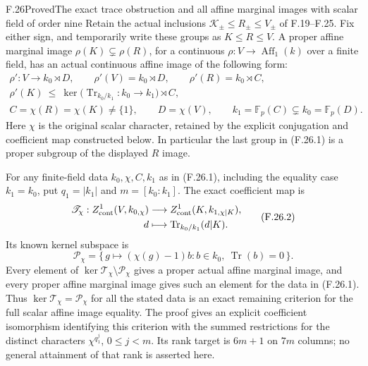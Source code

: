 \begin{claim}{F.26}{Proved}{The exact trace obstruction and all affine marginal images with scalar field of order nine}
Retain the actual inclusions
$\mathcal K_\pm\leq R_\pm\leq V_\pm$ of F.19--F.25.
Fix either sign, and temporarily write these groups as
$K\leq R\leq V$. A proper affine marginal image
$\rho(K)\subsetneq\rho(R)$, for a continuous
$\rho:V\to\operatorname{Aff}_1(k)$ over a finite field,
has an actual continuous affine image of the following form:
\[
 \begin{gathered}
 \rho':V\longrightarrow k_0\rtimes D,\qquad
 \rho'(V)=k_0\rtimes D,\qquad \rho'(R)=k_0\rtimes C,\\
 \rho'(K)\ \leq\
       \ker\bigl(\operatorname{Tr}_{k_0/k_1}:k_0\to k_1\bigr)
                       \rtimes C,\\
 C=\chi(R)=\chi(K)\ne\{1\},\qquad
 D=\chi(V),\qquad
 k_1=\mathbb F_p(C)\subsetneq k_0=\mathbb F_p(D).
 \end{gathered}                                                \tag{F.26.1}
\]
Here $\chi$ is the original scalar character, retained
by the explicit conjugation and coefficient map constructed
below. In particular the last group in (F.26.1) is a
proper subgroup of the displayed $R$ image.

For any finite-field data $k_0,\chi,C,k_1$ as in
(F.26.1), including the equality case $k_1=k_0$, put
$q_1=|k_1|$ and $m=[k_0:k_1]$. The exact coefficient map is
\[
 \begin{aligned}
 \mathscr T_\chi:
 Z^1_{\rm cont}(V,k_{0,\chi})&\longrightarrow
 Z^1_{\rm cont}(K,k_{1,\chi|K}),\\
 d&\longmapsto\operatorname{Tr}_{k_0/k_1}(d|K).
 \end{aligned}                                                \tag{F.26.2}
\]
Its known kernel subspace is
\[
 \mathscr P_\chi=
 \{\,g\mapsto(\chi(g)-1)b:
                      b\in k_0,\ \operatorname{Tr}(b)=0\,\}.
                                                               \tag{F.26.3}
\]
Every element of $\ker\mathscr T_\chi\setminus\mathscr P_\chi$
gives a proper actual affine marginal image, and every
proper affine marginal image gives such an element for
the data in (F.26.1). Thus
$\ker\mathscr T_\chi=\mathscr P_\chi$ for all the stated
data is an exact remaining criterion for the full
scalar affine image equality. The proof gives an explicit
coefficient isomorphism identifying this criterion with
the summed restrictions for the distinct characters
$\chi^{q_1^j}$, $0\leq j<m$. Its rank target is $6m+1$
on $7m$ columns; no general attainment of that rank
is asserted here.


\end{claim}

